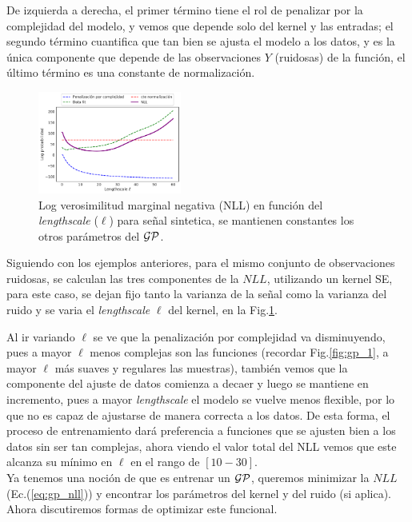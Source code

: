 De izquierda a derecha, el primer término tiene el rol de penalizar por la complejidad del modelo, y vemos que depende solo del kernel y las entradas; el segundo término cuantifica que tan bien se ajusta el modelo a los datos, y es la única componente que depende de las observaciones $Y$ (ruidosas) de la función, el último término es una constante de normalización.\\



\begin{figure}
\includegraphics[width=0.42\textwidth]{img/gp_nll_divided.pdf}
\caption{Log verosimilitud marginal negativa (NLL) en función del \textit{lengthscale} ($\ell$) para señal sintetica, se mantienen constantes los otros parámetros del $\mathcal{GP}$.}\label{fig:gp_4}
\end{figure} 

Siguiendo con los ejemplos anteriores, para el mismo conjunto de observaciones ruidosas, se calculan las tres componentes de la $NLL$, utilizando un kernel SE, para este caso, se dejan fijo tanto la varianza de la señal como la varianza del ruido y se varia el \textit{lengthscale} $\ell$ del kernel, en la Fig.\ref{fig:gp_4}.

Al ir variando $\ell$ se ve que la penalización por complejidad va disminuyendo, pues a mayor $\ell$ menos complejas son las funciones (recordar Fig.\ref{fig:gp_1}, a mayor $\ell$ más suaves y regulares las muestras), también vemos que la componente del ajuste de datos comienza a decaer y luego se mantiene en incremento, pues a mayor \textit{lengthscale} el modelo se vuelve menos flexible, por lo que no es capaz de ajustarse de manera correcta a los datos. De esta forma, el proceso de entrenamiento dará preferencia a funciones que se ajusten bien a los datos sin ser tan complejas, ahora viendo el valor total del NLL vemos que este alcanza su mínimo en $\ell$ en el rango de $[10-30]$.\\


Ya tenemos una noción de que es entrenar un $\mathcal{GP}$, queremos minimizar la $NLL$ (Ec.(\ref{eq:gp_nll})) y encontrar los parámetros del kernel y del ruido (si aplica). Ahora discutiremos formas de optimizar este funcional.\\

